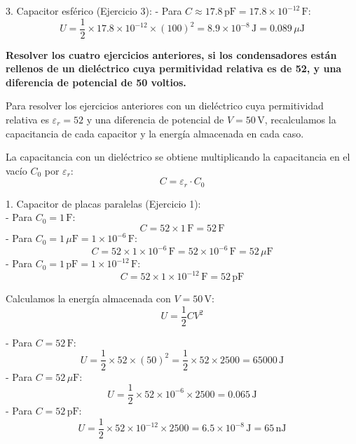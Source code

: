 \documentclass[answers]{exam} %
\begin{document}
\begin{questions}
        3. Capacitor esférico (Ejercicio 3):
           - Para \( C \approx 17.8 \, \text{pF} = 17.8 \times 10^{-12} \, \text{F} \):
             \[
             U = \frac{1}{2} \times 17.8 \times 10^{-12} \times (100)^2 = 8.9 \times 10^{-8} \, \text{J} = 0.089 \, \mu \text{J}
             \]
        

        

     \vspace{0.5cm}
    \question \large\textbf{Resolver los cuatro ejercicios anteriores, si los condensadores están rellenos de un dieléctrico cuya permitividad relativa es de 52, y una diferencia de potencial de 50
    voltios.}
    
        Para resolver los ejercicios anteriores con un dieléctrico cuya permitividad relativa es \( \varepsilon_r = 52 \) y una diferencia de potencial de \( V = 50 \, \text{V} \), recalculamos la capacitancia de cada capacitor y la energía almacenada en cada caso.
        
        La capacitancia con un dieléctrico se obtiene multiplicando la capacitancia en el vacío \( C_0 \) por \( \varepsilon_r \):
        \[
        C = \varepsilon_r \cdot C_0
        \]
        
        1. Capacitor de placas paralelas (Ejercicio 1):\\
        - Para \( C_0 = 1 \, \text{F} \):
          \[
          C = 52 \times 1 \, \text{F} = 52 \, \text{F}
          \]
        - Para \( C_0 = 1 \, \mu \text{F} = 1 \times 10^{-6} \, \text{F} \):
          \[
          C = 52 \times 1 \times 10^{-6} \, \text{F} = 52 \times 10^{-6} \, \text{F} = 52 \, \mu \text{F}
          \]
        - Para \( C_0 = 1 \, \text{pF} = 1 \times 10^{-12} \, \text{F} \):
          \[
          C = 52 \times 1 \times 10^{-12} \, \text{F} = 52 \, \text{pF}
          \]
        
        Calculamos la energía almacenada con \( V = 50 \, \text{V} \):
        \[
        U = \frac{1}{2} C V^2
        \]
        
        - Para \( C = 52 \, \text{F} \):
          \[
          U = \frac{1}{2} \times 52 \times (50)^2 = \frac{1}{2} \times 52 \times 2500 = 65000 \, \text{J}
          \]
        - Para \( C = 52 \, \mu \text{F} \):
          \[
          U = \frac{1}{2} \times 52 \times 10^{-6} \times 2500 = 0.065 \, \text{J}
          \]
        - Para \( C = 52 \, \text{pF} \):
          \[
          U = \frac{1}{2} \times 52 \times 10^{-12} \times 2500 = 6.5 \times 10^{-8} \, \text{J} = 65 \, \text{nJ}
          \]
        

\end{questions}
\end{document}
